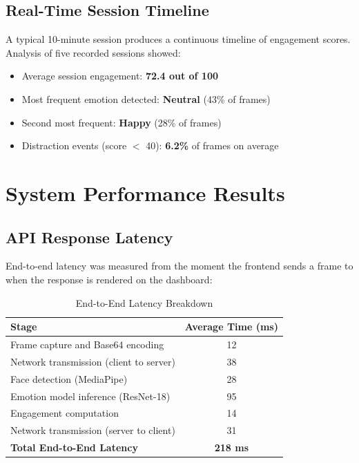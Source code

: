 \subsection{Real-Time Session Timeline}

A typical 10-minute session produces a continuous timeline of engagement
scores. Analysis of five recorded sessions showed:
\begin{itemize}
    \item Average session engagement: \textbf{72.4 out of 100}
    \item Most frequent emotion detected: \textbf{Neutral} (43\% of frames)
    \item Second most frequent: \textbf{Happy} (28\% of frames)
    \item Distraction events (score $<$ 40): \textbf{6.2\%} of frames
          on average
\end{itemize}

\section{System Performance Results}

\subsection{API Response Latency}

End-to-end latency was measured from the moment the frontend sends a frame
to when the response is rendered on the dashboard:

\begin{table}[H]
\centering
\caption{End-to-End Latency Breakdown}
\begin{tabular}{lc}
\toprule
\textbf{Stage}                          & \textbf{Average Time (ms)} \\
\midrule
Frame capture and Base64 encoding       & 12 \\
Network transmission (client to server) & 38 \\
Face detection (MediaPipe)              & 28 \\
Emotion model inference (ResNet-18)     & 95 \\
Engagement computation                  & 14 \\
Network transmission (server to client) & 31 \\
\midrule
\textbf{Total End-to-End Latency}       & \textbf{218 ms} \\
\bottomrule
\end{tabular}
\end{table}

